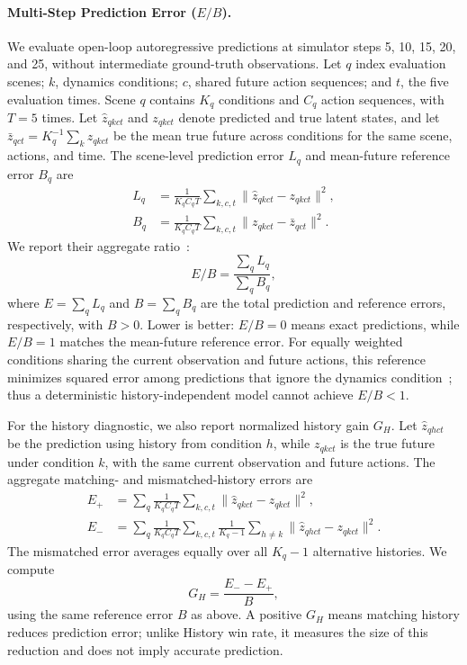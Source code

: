 \paragraph{Multi-Step Prediction Error ($E/B$).}
We evaluate open-loop autoregressive predictions at simulator steps 5, 10, 15, 20, and 25, without intermediate ground-truth observations.
Let $q$ index evaluation scenes; $k$, dynamics conditions; $c$, shared future action sequences; and $t$, the five evaluation times.
Scene $q$ contains $K_q$ conditions and $C_q$ action sequences, with $T=5$ times.
Let $\hat z_{qkct}$ and $z_{qkct}$ denote predicted and true latent states, and let $\bar z_{qct}=K_q^{-1}\sum_k z_{qkct}$ be the mean true future across conditions for the same scene, actions, and time.
The scene-level prediction error $L_q$ and mean-future reference error $B_q$ are
\begin{equation}
\begin{aligned}
L_q &=\frac{1}{K_qC_qT}\sum_{k,c,t}\|\hat z_{qkct}-z_{qkct}\|^2,\\
B_q &=\frac{1}{K_qC_qT}\sum_{k,c,t}\|z_{qkct}-\bar z_{qct}\|^2.
\end{aligned}
\end{equation}
We report their aggregate ratio~\cite{murphy1988skill}:
\begin{equation}
E/B=\frac{\sum_q L_q}{\sum_q B_q},
\label{eq:complete-error}
\end{equation}
where $E=\sum_q L_q$ and $B=\sum_q B_q$ are the total prediction and reference errors, respectively, with $B>0$.
Lower is better: $E/B=0$ means exact predictions, while $E/B=1$ matches the mean-future reference error.
For equally weighted conditions sharing the current observation and future actions, this reference minimizes squared error among predictions that ignore the dynamics condition~\cite{gneiting2011point}; thus a deterministic history-independent model cannot achieve $E/B<1$.


For the history diagnostic, we also report normalized history gain $G_H$.
Let $\hat z_{qhct}$ be the prediction using history from condition $h$, while $z_{qkct}$ is the true future under condition $k$, with the same current observation and future actions.
The aggregate matching- and mismatched-history errors are
\begin{equation}
\begin{aligned}
E_+ &= \sum_q \frac{1}{K_qC_qT}
\sum_{k,c,t}\|\hat z_{qkct}-z_{qkct}\|^2,\\
E_- &= \sum_q \frac{1}{K_qC_qT}
\sum_{k,c,t}\frac{1}{K_q-1}\sum_{h\ne k}
\|\hat z_{qhct}-z_{qkct}\|^2.
\end{aligned}
\end{equation}
The mismatched error averages equally over all $K_q-1$ alternative histories.
We compute
\begin{equation}
G_H = \frac{E_- - E_+}{B},
\label{eq:history-gain}
\end{equation}
using the same reference error $B$ as above.
A positive $G_H$ means matching history reduces prediction error; unlike History win rate, it measures the size of this reduction and does not imply accurate prediction.


